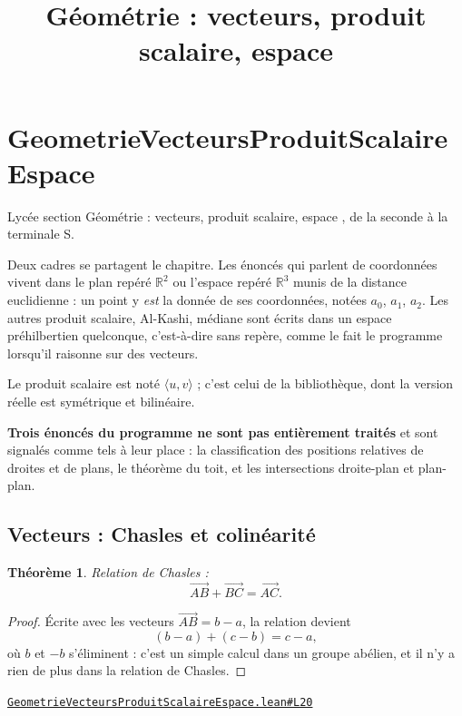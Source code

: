 \documentclass[11pt,a4paper]{article}
\title{Géométrie : vecteurs, produit scalaire, espace}
\date{}
\theoremstyle{definition}
\theoremstyle{plain}
\newtheorem{theoreme}{Théorème}
\newcommand{\source}[2]{\par\smallskip\noindent\hfill{\footnotesize\href{#1}{\texttt{#2}}}\par\smallskip}
\begin{document}
\maketitle
\sloppy

\section{GeometrieVecteursProduitScalaireEspace}

\noindent
Lycée \textemdash{} section \og{} Géométrie : vecteurs, produit scalaire, espace \fg{}, de
la seconde à la terminale S.

\medskip\noindent
Deux cadres se partagent le chapitre. Les énoncés qui parlent de coordonnées vivent dans
le plan repéré $\mathbb{R}^{2}$ ou l'espace repéré $\mathbb{R}^{3}$ munis de la distance
euclidienne : un point y \emph{est} la donnée de ses coordonnées, notées $a_0$, $a_1$,
$a_2$. Les autres \textemdash{} produit scalaire, Al-Kashi, médiane \textemdash{} sont
écrits dans un espace préhilbertien quelconque, c'est-à-dire sans repère, comme le fait le
programme lorsqu'il raisonne sur des vecteurs.

\medskip\noindent
Le produit scalaire est noté $\langle u, v\rangle$ ; c'est celui de la bibliothèque, dont
la version réelle est symétrique et bilinéaire.

\medskip\noindent
\textbf{Trois énoncés du programme ne sont pas entièrement traités} et sont signalés comme
tels à leur place : la classification des positions relatives de droites et de plans, le
théorème du toit, et les intersections droite-plan et plan-plan.

\subsection{Vecteurs : Chasles et colinéarité}

\begin{theoreme}
Relation de Chasles :
\[ \overrightarrow{AB} + \overrightarrow{BC} = \overrightarrow{AC} . \]
\end{theoreme}

\begin{proof}
Écrite avec les vecteurs $\overrightarrow{AB} = b - a$, la relation devient
\[ (b - a) + (c - b) = c - a , \]
où $b$ et $-b$ s'éliminent : c'est un simple calcul dans un groupe abélien, et il n'y a
rien de plus dans la relation de Chasles.
\end{proof}
\source{https://github.com/Commutator-IO/learn-lean/blob/main/cours/02-lycee/08-geometrie-vecteurs-produit-scalaire-espace/GeometrieVecteursProduitScalaireEspace.lean\#L20}{GeometrieVecteursProduitScalaireEspace.lean\#L20}
\end{document}
